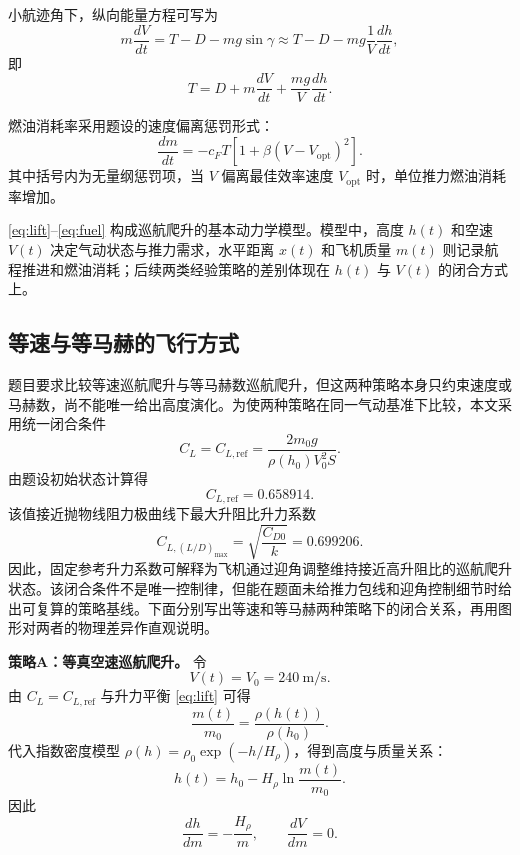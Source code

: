 \documentclass[withoutpreface,bwprint]{cumcmthesis}
\begin{document}
小航迹角下，纵向能量方程可写为
\begin{equation}
m\frac{dV}{dt}=T-D-mg\sin\gamma\approx T-D-mg\frac{1}{V}\frac{dh}{dt},
\label{eq:energy}
\end{equation}
即
\begin{equation}
T=D+m\frac{dV}{dt}+\frac{mg}{V}\frac{dh}{dt}.
\label{eq:thrust}
\end{equation}

燃油消耗率采用题设的速度偏离惩罚形式：
\begin{equation}
\frac{dm}{dt}=-c_FT\left[1+\beta(V-V_{\mathrm{opt}})^2\right].
\label{eq:fuel}
\end{equation}
其中括号内为无量纲惩罚项，当 $V$ 偏离最佳效率速度 $V_{\mathrm{opt}}$ 时，单位推力燃油消耗率增加。

\eqref{eq:lift}--\eqref{eq:fuel} 构成巡航爬升的基本动力学模型。模型中，高度 $h(t)$ 和空速 $V(t)$ 决定气动状态与推力需求，水平距离 $x(t)$ 和飞机质量 $m(t)$ 则记录航程推进和燃油消耗；后续两类经验策略的差别体现在 $h(t)$ 与 $V(t)$ 的闭合方式上。

\subsection{等速与等马赫的飞行方式}

题目要求比较等速巡航爬升与等马赫数巡航爬升，但这两种策略本身只约束速度或马赫数，尚不能唯一给出高度演化。为使两种策略在同一气动基准下比较，本文采用统一闭合条件
\begin{equation}
C_L=C_{L,\mathrm{ref}}=\frac{2m_0g}{\rho(h_0)V_0^2S}.
\label{eq:CL_ref}
\end{equation}
由题设初始状态计算得
\begin{equation}
C_{L,\mathrm{ref}}=0.658914.
\label{eq:CL_ref_val}
\end{equation}
该值接近抛物线阻力极曲线下最大升阻比升力系数
\begin{equation}
C_{L,(L/D)_{\max}}=\sqrt{\frac{C_{D0}}{k}}=0.699206.
\label{eq:CL_maxLD}
\end{equation}
因此，固定参考升力系数可解释为飞机通过迎角调整维持接近高升阻比的巡航爬升状态。该闭合条件不是唯一控制律，但能在题面未给推力包线和迎角控制细节时给出可复算的策略基线。下面分别写出等速和等马赫两种策略下的闭合关系，再用图形对两者的物理差异作直观说明。

\textbf{策略A：等真空速巡航爬升。} 令
\begin{equation}
V(t)=V_0=240\ \mathrm{m/s}.
\label{eq:const_V}
\end{equation}
由 $C_L=C_{L,\mathrm{ref}}$ 与升力平衡 \eqref{eq:lift} 可得
\begin{equation}
\frac{m(t)}{m_0}=\frac{\rho(h(t))}{\rho(h_0)}.
\label{eq:m_rho_ratio}
\end{equation}
代入指数密度模型 $\rho(h)=\rho_0\exp(-h/H_\rho)$，得到高度与质量关系：
\begin{equation}
h(t)=h_0-H_\rho \ln\frac{m(t)}{m_0}.
\label{eq:h_vs_m_constV}
\end{equation}
因此
\begin{equation}
\frac{dh}{dm}=-\frac{H_\rho}{m},\qquad \frac{dV}{dm}=0.
\label{eq:deriv_constV}
\end{equation}
\end{document}
